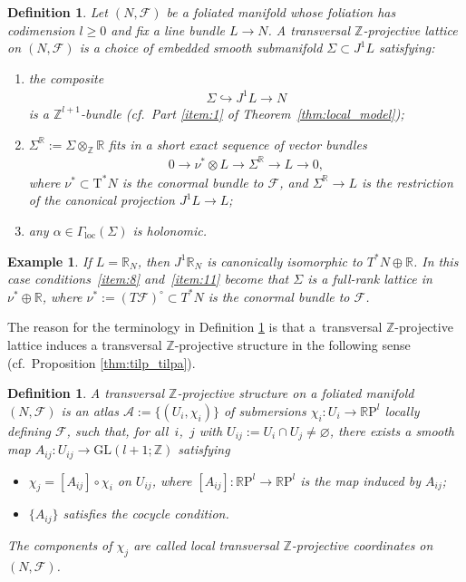 \documentclass[10pt,a4paper]{amsart}
\numberwithin{equation}{section}
\newtheorem{Definition}[Theorem]{Definition}
\newtheorem{Example}[Theorem]{Example}
\newcommand{\cotan}{\mathrm{T}^*} %
\newcommand{\RR}{\mathbb{R}}
\newcommand{\ZZ}{\mathbb{Z}}
\begin{document}
\begin{Definition}\label{defn:tilp}
Let $(N,\mathcal{F})$ be a foliated manifold whose foliation has codimension $l \geq 0$ and f\/ix a line bundle $L \to N$. A {\it transversal $\ZZ$-projective lattice} on $(N,\mathcal{F})$ is a choice of embedded smooth submanifold $\Sigma\subset J^1L$ satisfying:
 \begin{enumerate}[label=(T\arabic*), ref=(T\arabic*)]\itemsep=0pt
 \item\label{item:8} the composite
 \begin{gather*}
 \Sigma\hookrightarrow J^1L\to N
 \end{gather*}
 is a $\ZZ^{l+1}$-bundle (cf.\ Part \ref{item:1} of Theorem~\ref{thm:local_model});
 \item \label{item:11} $\Sigma^{\RR} := \Sigma \otimes_{\ZZ} \RR$ f\/its in a short exact sequence of vector bundles
 \begin{gather*}
 0 \to \nu^* \otimes L \to \Sigma^{\RR} \to L \to 0,
 \end{gather*}
where $\nu^* \subset \cotan N$ is the conormal bundle to $\mathcal{F}$, and $\Sigma^{\RR} \to L$ is the restriction of the canonical projection $J^1 L \to L$;
 \item\label{item:9} any $\alpha \in \Gamma_{\mathrm{loc}}(\Sigma)$ is holonomic.
 \end{enumerate}
\end{Definition}

\begin{Example}\label{exm:trivial_bundle} If $L = \RR_N$, then $J^1\RR_N$ is canonically isomorphic to $T^*N \oplus \RR$. In this case conditions~\ref{item:8} and~\ref{item:11} become that $\Sigma$ is a full-rank lattice in $\nu^* \oplus \RR$, where $\nu^* :=\left(T\mathcal{F}\right)^{\circ}\subset T^*N$ is the conormal bundle to $\mathcal{F}$.
\end{Example}

The reason for the terminology in Def\/inition \ref{defn:tilp} is that a~transversal $\ZZ$-projective lattice induces a transversal $\ZZ$-projective structure in the following sense (cf.\ Proposition \ref{thm:tilp_tilpa}).

\begin{Definition}\label{defn:tipa} A {\it transversal $\ZZ$-projective structure} on a foliated manifold $(N,\mathcal{F})$ is an atlas $\mathcal{A}
 :=\{(U_i, \chi_i)\}$ of submersions $\chi_i \colon U_i \to \RR\mathrm{P}^l$ locally def\/ining $\mathcal{F}$, such that, for all~$i$,~$j$ with $U_{ij} := U_i \cap U_j \neq \varnothing$, there exists a smooth map $A_{ij}\colon U_{ij} \to \mathrm{GL}(l+1;\ZZ)$ satisfying
 \begin{itemize}\itemsep=0pt
 \item $\chi_j = [A_{ij}]\circ \chi_i$ on $U_{ij}$, where $[A_{ij}] \colon \RR \mathrm{P}^l \to \RR \mathrm{P}^l$ is the map induced by $A_{ij}$;
 \item $\{A_{ij}\}$ satisf\/ies the cocycle condition.
 \end{itemize}
The components of $\chi_j$ are called {\em local transversal $\ZZ$-projective coordinates} on $(N,\mathcal{F})$.
\end{Definition}
\end{document}
